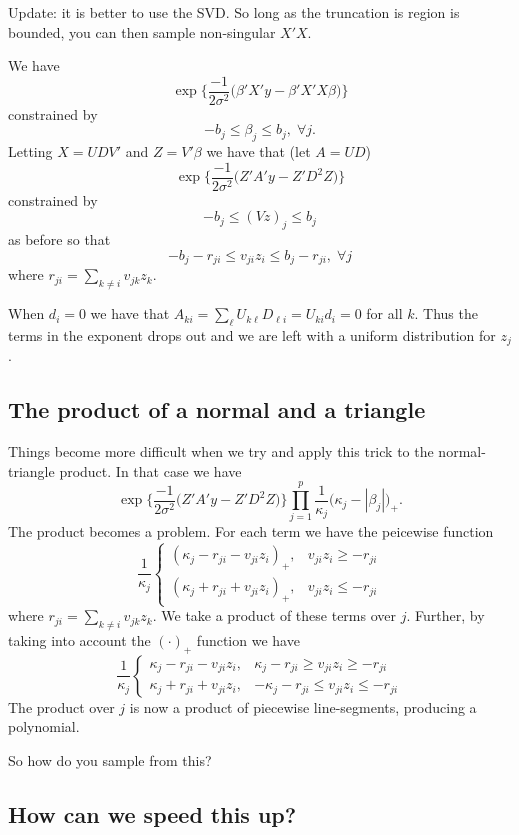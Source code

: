 \documentclass{article}
\begin{document}
Update: it is better to use the SVD.  So long as the truncation is region is
bounded, you can then sample non-singular $X'X$.

We have 
\[
\exp \Big\{ \frac{-1}{2 \sigma^2} \Big( \beta' X' y - \beta' X'X \beta \Big) \Big\}
\]
constrained by
\[
- b_j \leq \beta_j \leq b_j, \; \forall j.
\]
Letting $X = UDV'$ and $Z = V'\beta$ we have that (let $A = UD$)
\[
\exp \Big\{ \frac{-1}{2 \sigma^2} \Big( Z' A'y - Z' D^2 Z \Big) \Big\}
\]
constrained by
\[
- b_j \leq (Vz)_j \leq b_j
\]
as before so that
\[
-b_j - r_{ji} \leq v_{ji} z_i \leq b_j - r_{ji}, \; \forall j
\]
where $r_{ji} = \sum_{k \neq i} v_{jk} z_k$.

When $d_i = 0$ we have that $A_{ki} = \sum_{\ell} U_{k\ell} D_{\ell i} = U_{ki}
d_i = 0$ for all $k$.  Thus the terms in the exponent drops out and we are left
with a uniform distribution for $z_j$.

\subsection*{The product of a normal and a triangle}

Things become more difficult when we try and apply this trick to the
normal-triangle product.  In that case we have
\[
\exp \Big\{ \frac{-1}{2 \sigma^2} \Big( Z' A'y - Z' D^2 Z \Big) \Big\} 
\prod_{j=1}^p \frac{1}{\kappa_j} \Big( \kappa_j - |\beta_j| \Big)_+.
\]
The product becomes a problem.  For each term we have the peicewise function
\[
\frac{1}{\kappa_j}
\begin{cases}
(\kappa_j - r_{ji} - v_{ji} z_i)_+, & v_{ji} z_i \geq - r_{ji} \\
(\kappa_j + r_{ji} + v_{ji} z_i)_+, & v_{ji} z_i \leq - r_{ji}
\end{cases}
\]
where $r_{ji} = \sum_{k \neq i} v_{jk} z_k$.  We take a product of these terms
over $j$.  Further, by taking into account the $(\cdot)_+$ function we have
\[
\frac{1}{\kappa_j}
\begin{cases}
\kappa_j - r_{ji} - v_{ji} z_i, & \kappa_j - r_{ji} \geq v_{ji} z_i \geq - r_{ji} \\
\kappa_j + r_{ji} + v_{ji} z_i, & -\kappa_j - r_{ji} \leq v_{ji} z_i \leq - r_{ji}
\end{cases}
\]
The product over $j$ is now a product of piecewise line-segments, producing a
polynomial.

So how do you sample from this?

\subsection{How can we speed this up?}
\end{document}
